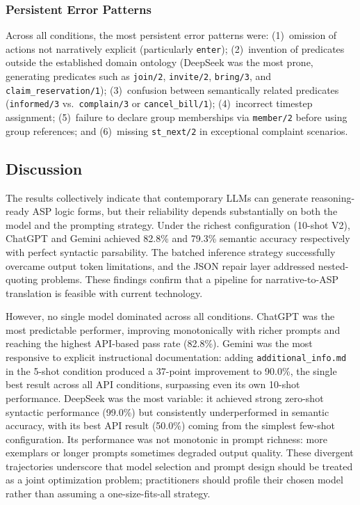 \documentclass[runningheads]{llncs}
\begin{document}
\subsubsection{Persistent Error Patterns}

Across all conditions, the most persistent error patterns were: (1)~omission
of actions not narratively explicit (particularly \texttt{enter});
(2)~invention of predicates outside the established domain ontology
(DeepSeek was the most prone, generating predicates such as \texttt{join/2},
\texttt{invite/2}, \texttt{bring/3}, and \texttt{claim\_reservation/1});
(3)~confusion between semantically related predicates (\texttt{informed/3}
vs.\ \texttt{complain/3} or \texttt{cancel\_bill/1}); (4)~incorrect timestep
assignment; (5)~failure to declare group memberships via \texttt{member/2}
before using group references; and (6)~missing \texttt{st\_next/2} in
exceptional complaint scenarios.

\subsection{Discussion}
\label{sec:discussion}

The results collectively indicate that contemporary LLMs can generate
reasoning-ready ASP logic forms, but their reliability depends substantially on
both the model and the prompting strategy. Under the richest configuration
(10-shot V2), ChatGPT and Gemini achieved 82.8\% and 79.3\% semantic accuracy
respectively with perfect syntactic parsability. The batched inference strategy
successfully overcame output token limitations, and the JSON repair layer
addressed nested-quoting problems. These findings confirm that a pipeline for
narrative-to-ASP translation is feasible with current technology.

However, no single model dominated across all conditions. ChatGPT was the most
predictable performer, improving monotonically with richer prompts and reaching
the highest API-based pass rate (82.8\%). Gemini was the most responsive to
explicit instructional documentation: adding \texttt{additional\_info.md} in
the 5-shot condition produced a 37-point improvement to 90.0\%, the single best
result across all API conditions, surpassing even its own 10-shot performance.
DeepSeek was the most variable: it achieved strong zero-shot syntactic
performance (99.0\%) but consistently underperformed in semantic accuracy, with
its best API result (50.0\%) coming from the simplest few-shot configuration.
Its performance was not monotonic in prompt richness: more exemplars or longer
prompts sometimes degraded output quality. These divergent trajectories
underscore that model selection and prompt design should be treated as a joint
optimization problem; practitioners should profile their chosen model rather
than assuming a one-size-fits-all strategy.
\end{document}
